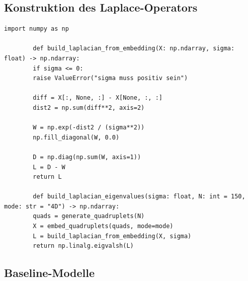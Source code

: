 \documentclass[11pt,a4paper,draft]{article}
\begin{document}
	\subsection{Konstruktion des Laplace-Operators}
	
	\begin{lstlisting}[caption={Aufbau der Gewichtsmatrix und des Graph-Laplacians.}]
		import numpy as np
		
		def build_laplacian_from_embedding(X: np.ndarray, sigma: float) -> np.ndarray:
		if sigma <= 0:
		raise ValueError("sigma muss positiv sein")
		
		diff = X[:, None, :] - X[None, :, :]
		dist2 = np.sum(diff**2, axis=2)
		
		W = np.exp(-dist2 / (sigma**2))
		np.fill_diagonal(W, 0.0)
		
		D = np.diag(np.sum(W, axis=1))
		L = D - W
		return L
		
		def build_laplacian_eigenvalues(sigma: float, N: int = 150, mode: str = "4D") -> np.ndarray:
		quads = generate_quadruplets(N)
		X = embed_quadruplets(quads, mode=mode)
		L = build_laplacian_from_embedding(X, sigma)
		return np.linalg.eigvalsh(L)
	\end{lstlisting}
	
	\subsection{Baseline-Modelle}
	
\end{document}
